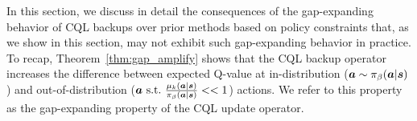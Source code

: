 
In this section, we discuss in detail the consequences of the gap-expanding behavior of CQL backups over prior methods based on policy constraints that, as we show in this section, may not exhibit such gap-expanding behavior in practice. To recap, Theorem~\ref{thm:gap_amplify} shows that the CQL backup operator increases the difference between expected Q-value at in-distribution ($\boldsymbol{a} \sim {\pi_\beta}(\boldsymbol{a}|\boldsymbol{s})$) and out-of-distribution ($\boldsymbol{a} \text{~s.t.~} \frac{\mu_k(\boldsymbol{a}|\boldsymbol{s})}{{\pi_\beta}(\boldsymbol{a}|\boldsymbol{s})} << 1$) actions. We refer to this property as the gap-expanding property of the CQL update operator.



